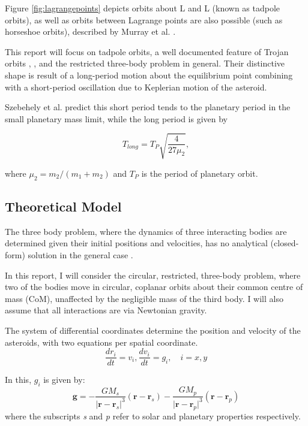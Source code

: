 \documentclass[11pt, a4paper,twocolumn]{article} %
\begin{document}
Figure \ref{fig:lagrangepoints} depicts orbits about L and L (known as tadpole orbits), as well as orbits between Lagrange points are also possible (such as horseshoe orbits), described by Murray et al. \cite{Murray1999}.

This report will focus on tadpole orbits, a well documented feature of Trojan orbits \cite{Garfinkel1983}, \cite{Dermott1981}, and the restricted three-body problem in general. Their distinctive shape is result of a long-period motion about the equilibrium point combining with a short-period oscillation due to Keplerian motion of the asteroid.

Szebehely et al. \cite{Szebehely1969} predict this short period tends to the planetary period in the small planetary mass limit, while the long period is given by

\begin{equation}
T_{long} = T_{P} \sqrt{\frac{4}{27 \mu_{2}}},  
\end{equation}

where $\mu_{2} = m_{2} / (m_{1} + m_{2})$ and $ T_{P} $ is the period of planetary orbit.

\subsection{Theoretical Model} \label{theory}
The three body problem, where the dynamics of three interacting bodies are determined given their initial positions and velocities, has no analytical (closed-form) solution in the general case \cite{Barrow2008}.

In this report, I will consider the circular, restricted, three-body problem, where two of the bodies move in circular, coplanar orbits about their common centre of mass (CoM), unaffected by the negligible mass of the third body. I will also assume that all interactions are via Newtonian gravity.

The system of differential coordinates determine the position and velocity of the asteroids, with two equations per spatial coordinate.
\begin{equation}
\frac{dr_{i}}{dt} = v_{i}, \frac{dv_{i}}{dt} = g_{i}, \quad i = x,y 
\end{equation}

In this, $g_{i}$ is given by:
\begin{equation}
\textbf{g}= - \frac{G M_{s}}{\lvert \textbf{r} - \textbf{r}_{s} \rvert ^{3}} (\textbf{r} - \textbf{r}_{s})
		 - \frac{G M_{p}}{\lvert \textbf{r} - \textbf{r}_{p} \rvert ^{3}} (\textbf{r} - \textbf{r}_{p})
\end{equation}
where the subscripts \textit{s} and \textit{p} refer to solar and planetary properties respectively.
\end{document}
